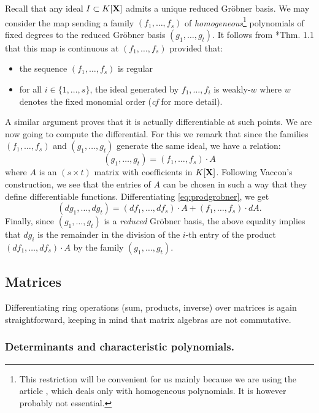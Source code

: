 \documentclass{lms}
\begin{document}
Recall that any 
ideal $I \subset K[\mathbf X]$ admits a unique reduced Gr\"obner basis. We may
consider the map sending a family $(f_1, \ldots, f_s)$ of 
\emph{homogeneous}\footnote{This restriction will be convenient for us 
mainly because we are using the article \cite{vaccon:14a}, which deals only 
with homogeneous polynomials. It is however probably not essential.} 
polynomials of fixed degrees to the reduced Gr\"obner basis $(g_1, 
\ldots, g_t)$. It follows from \cite{vaccon:14a}*{Thm. 1.1} that this 
map is continuous at $(f_1, \ldots, f_s)$ provided that:
\begin{itemize}
\item the sequence $(f_1, \ldots, f_s)$ is regular
\item for all $i \in \{1, \ldots, s\}$, the ideal generated by
$f_1, \ldots, f_i$ is weakly-$w$ where $w$ denotes the fixed monomial
order (\emph{cf} \cite{vaccon:14a} for more detail).
\end{itemize}
A similar argument proves that it is actually differentiable at such
points. We are now going to compute the differential. For this we
remark that since the families $(f_1, \ldots, f_s)$ and $(g_1, \ldots,
g_t)$ generate the same ideal, we have a relation:
\begin{equation}
\label{eq:prodgrobner}
(g_1, \ldots, g_t) = (f_1, \ldots, f_s) \cdot A
\end{equation}
where $A$ is an $(s \times t)$ matrix with coefficients in $K[\mathbf X]$.
Following Vaccon's construction, we see that the entries of $A$ 
can be chosen in such a way that they define differentiable functions.
Differentiating \eqref{eq:prodgrobner}, we get
$$(d g_1, \ldots, d g_t) =
(d f_1, \ldots, d f_s) \cdot A + (f_1, \ldots, f_s) \cdot dA.$$
Finally, since $(g_1, \ldots, g_t)$ is a \emph{reduced} Gr\"obner
basis, the above equality implies that $d g_i$ is the remainder in
the division of the $i$-th entry of the product
$(d f_1, \ldots, d f_s) \cdot A$ by the family $(g_1, \ldots, g_t)$.

\subsection{Matrices}
\label{ssec:matrices}

Differentiating ring operations (sum, products, inverse) over matrices 
is again straightforward, keeping in mind that matrix algebras are not
commutative.

\subsubsection*{Determinants and characteristic polynomials.}
\end{document}
